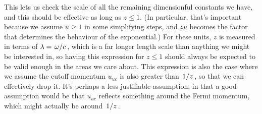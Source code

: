 \documentclass[../main.tex]{subfiles}
\begin{document}
	This lets us check the scale of all the remaining dimensionful constants we have, and this should be effective as long as $z \leq 1$.
	(In particular, that's important because we assume $u \geq 1$ in some simplifying steps, and $z u$ becomes the factor that determines the behaviour of the exponential.)
	For these units, $z$ is measured in terms of $\lambda = \flatfrac{\omega}{c}$, which is a far longer length scale than anything we might be interested in, so having this expression for $z \leq 1$ should always be expected to be valid enough in the areas we care about.
	This expression is also the case where we assume the cutoff momentum $u_{uc}$ is also greater than $\flatfrac{1}{z}$, so that we can effectively drop it.
	It's perhaps a less justifiable assumption, in that a good assumption would be that $u_{uc}$ reflects something around the Fermi momentum, which might actually be around $\flatfrac{1}{z}$.
\end{document}
